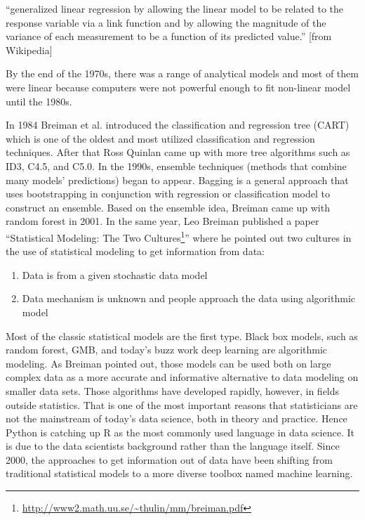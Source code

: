 \documentclass[12pt,]{krantz}
\providecommand{\tightlist}{%
  \setlength{\itemsep}{0pt}\setlength{\parskip}{0pt}}
\renewenvironment{quote}{\begin{VF}}{\end{VF}}
\renewcommand{\href}[2]{#2\footnote{\url{#1}}}
\theoremstyle{definition}
\theoremstyle{definition}
\theoremstyle{definition}
\theoremstyle{remark}
\begin{document}
\begin{quote}
``generalized linear regression by allowing the linear model to be
related to the response variable via a link function and by allowing the
magnitude of the variance of each measurement to be a function of its
predicted value.'' {[}from Wikipedia{]}
\end{quote}

By the end of the 1970s, there was a range of analytical models and most
of them were linear because computers were not powerful enough to fit
non-linear model until the 1980s.

In 1984 Breiman et al\citep{Breiman1984}. introduced the classification
and regression tree (CART) which is one of the oldest and most utilized
classification and regression techniques. After that Ross Quinlan came
up with more tree algorithms such as ID3, C4.5, and C5.0. In the 1990s,
ensemble techniques (methods that combine many models' predictions)
began to appear. Bagging is a general approach that uses bootstrapping
in conjunction with regression or classification model to construct an
ensemble. Based on the ensemble idea, Breiman came up with random forest
in 2001\citep{Breiman2001}. In the same year, Leo Breiman published a
paper ``\href{http://www2.math.uu.se/~thulin/mm/breiman.pdf}{Statistical
Modeling: The Two Cultures}'' \citep{Breiman2001TwoCulture} where he
pointed out two cultures in the use of statistical modeling to get
information from data:

\begin{enumerate}
\def\labelenumi{(\arabic{enumi})}
\tightlist
\item
  Data is from a given stochastic data model\\
\item
  Data mechanism is unknown and people approach the data using
  algorithmic model
\end{enumerate}

Most of the classic statistical models are the first type. Black box
models, such as random forest, GMB, and today's buzz work deep learning
are algorithmic modeling. As Breiman pointed out, those models can be
used both on large complex data as a more accurate and informative
alternative to data modeling on smaller data sets. Those algorithms have
developed rapidly, however, in fields outside statistics. That is one of
the most important reasons that statisticians are not the mainstream of
today's data science, both in theory and practice. Hence Python is
catching up R as the most commonly used language in data science. It is
due to the data scientists background rather than the language itself.
Since 2000, the approaches to get information out of data have been
shifting from traditional statistical models to a more diverse toolbox
named machine learning.
\end{document}
